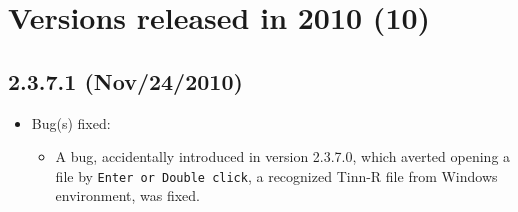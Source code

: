 
\section{Versions released in 2010 (10)}
\subsection*{2.3.7.1 (Nov/24/2010)}
\begin{itemize}
  \item Bug(s) fixed:
    \begin{itemize}
      \item A bug, accidentally introduced in version 2.3.7.0, which averted opening a file by \texttt{Enter or Double click},
        a recognized Tinn-R file from Windows environment, was fixed.
    \end{itemize}
\end{itemize}



